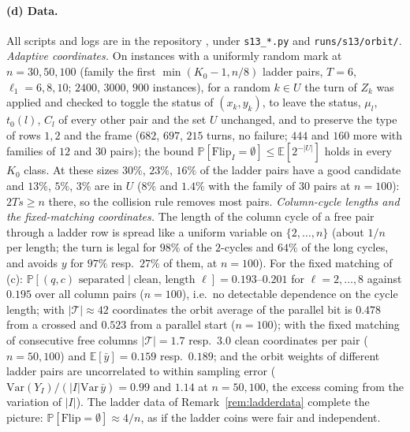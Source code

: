 \documentclass[11pt]{article}
\theoremstyle{definition}
\newcommand{\E}{\mathbb{E}}
\renewcommand{\Pr}{\mathbb{P}}
\begin{document}
\paragraph{(d) Data.}  All scripts and logs are in the repository \cite{repo}, under
\texttt{s13\_*.py} and \texttt{runs/s13/orbit/}.  \emph{Adaptive coordinates.}  On
instances with a uniformly random mark at $n=30,50,100$ (family the first $\min(K_0-1,n/8)$ ladder pairs,
$T=6$, $\ell_1=6,8,10$; $2400$, $3000$, $900$ instances), for a random $k\in U$ the turn of
$Z_k$ was applied and checked to toggle the status of $(x_k,y_k)$, to leave the status,
$\mu_l$, $t_0(l)$, $C_l$ of every other pair and the set $U$ unchanged, and to preserve the
type of rows $1,2$ and the frame ($682$, $697$, $215$ turns, no failure; $444$ and $160$
more with families of $12$ and $30$ pairs); the bound
$\Pr[\mathrm{Flip}_I=\emptyset]\le\E[2^{-|U|}]$ holds in every $K_0$ class.  At these sizes
$30\%$, $23\%$, $16\%$ of the ladder pairs have a good candidate and $13\%$, $5\%$, $3\%$
are in $U$ ($8\%$ and $1.4\%$ with the family of $30$ pairs at $n=100$): $2Ts\ge n$ there,
so the collision rule removes most pairs.  \emph{Column-cycle lengths
and the fixed-matching coordinates.}  The length of the column cycle of a free pair through
a ladder row is spread like a uniform variable on $\{2,\dots,n\}$ (about $1/n$ per length;
the turn is legal for $98\%$ of the $2$-cycles and $64\%$ of the long cycles, and
avoids $y$ for $97\%$ resp.\ $27\%$ of them, at $n=100$).  For the fixed matching of
(c): $\Pr[(q,c)\text{ separated}\mid\text{clean, length }\ell]=0.193$--$0.201$ for
$\ell=2,\dots,8$ against $0.195$ over all column pairs ($n=100$), i.e.\ no detectable
dependence on the cycle length; with $|\mathcal T|\approx42$ coordinates the orbit average
of the parallel bit is $0.478$ from a crossed and $0.523$ from a parallel start ($n=100$);
with the fixed matching of consecutive free columns $|\mathcal T|=1.7$ resp.\ $3.0$ clean
coordinates per pair ($n=50,100$) and $\E[\bar y]=0.159$ resp.\ $0.189$; and the orbit
weights of different ladder pairs are uncorrelated to within sampling error
($\mathrm{Var}(Y_I)/(|I|\mathrm{Var}\,\bar y)=0.99$ and $1.14$ at $n=50,100$, the excess
coming from the variation of $|I|$).  The ladder data of Remark~\ref{rem:ladderdata}
complete the picture: $\Pr[\mathrm{Flip}=\emptyset]\approx4/n$, as if the ladder coins
were fair and independent.
\end{document}
